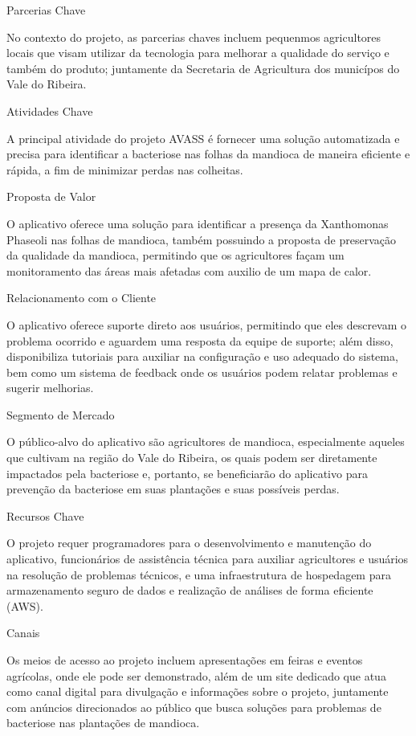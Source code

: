     Parcerias Chave

    No contexto do projeto, as parcerias chaves incluem pequenmos agricultores locais que visam utilizar da tecnologia para melhorar a qualidade do serviço e também do produto; juntamente da Secretaria de Agricultura dos municípos do Vale do Ribeira. 

    Atividades Chave

    A principal atividade do projeto AVASS é fornecer uma solução automatizada e precisa para identificar a bacteriose nas folhas da mandioca de maneira eficiente e rápida, a fim de minimizar perdas nas colheitas.

    Proposta de Valor

    O aplicativo oferece uma solução para identificar a presença da Xanthomonas Phaseoli nas folhas de mandioca, também possuindo a proposta de preservação da qualidade da mandioca, permitindo que os agricultores façam um monitoramento das áreas mais afetadas com auxilio de um mapa de calor.

    Relacionamento com o Cliente

    O aplicativo oferece suporte direto aos usuários, permitindo que eles descrevam o problema ocorrido e aguardem uma resposta da equipe de suporte; além disso, disponibiliza tutoriais para auxiliar na configuração e uso adequado do sistema, bem como um sistema de feedback onde os usuários podem relatar problemas e sugerir melhorias.

    Segmento de Mercado

    O público-alvo do aplicativo são agricultores de mandioca, especialmente aqueles que cultivam na região do Vale do Ribeira, os quais podem ser diretamente impactados pela bacteriose e, portanto, se beneficiarão do aplicativo para prevenção da bacteriose em suas plantações e suas possíveis perdas.

    Recursos Chave

    O projeto requer programadores para o desenvolvimento e manutenção do aplicativo, funcionários de assistência técnica para auxiliar agricultores e usuários na resolução de problemas técnicos, e uma infraestrutura de hospedagem para armazenamento seguro de dados e realização de análises de forma eficiente (AWS).

    Canais

    Os meios de acesso ao projeto incluem apresentações em feiras e eventos agrícolas, onde ele pode ser demonstrado, além de um site dedicado que atua como canal digital para divulgação e informações sobre o projeto, juntamente com anúncios direcionados ao público que busca soluções para problemas de bacteriose nas plantações de mandioca.

